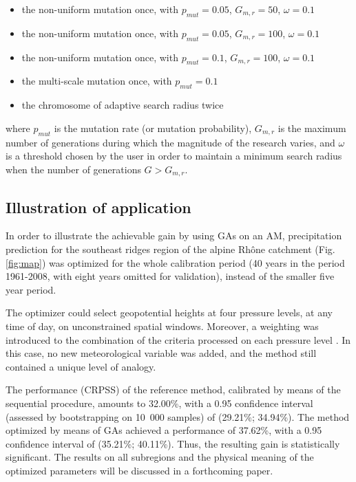 \documentclass{ametsoc}
\begin{document}
\begin{itemize}
	\setlength\itemsep{-4px}
	\item the non-uniform mutation once, with $p_{mut}=0.05$, $G_{m,r}=50$, $\omega=0.1$
	\item the non-uniform mutation once, with $p_{mut}=0.05$, $G_{m,r}=100$, $\omega=0.1$
	\item the non-uniform mutation once, with $p_{mut}=0.1$, $G_{m,r}=100$, $\omega=0.1$
	\item the multi-scale mutation once, with  $p_{mut}=0.1$
	\item the chromosome of adaptive search radius twice
\end{itemize}

where $p_{mut}$ is the mutation rate (or mutation probability), $G_{m,r}$ is the maximum number of generations during which the magnitude of the research varies, and $\omega$ is a threshold chosen by the user in order to maintain a minimum search radius when the number of generations $G>G_{m,r}$.


\subsection{Illustration of application}

In order to illustrate the achievable gain by using GAs on an AM, precipitation prediction for the southeast ridges region of the alpine Rh\^{o}ne catchment (Fig. \ref{fig:map}) was optimized for the whole calibration period (40 years in the period 1961-2008, with eight years omitted for validation), instead of the smaller five year period.

The optimizer could select geopotential heights at four pressure levels, at any time of day, on unconstrained spatial windows. Moreover, a weighting was introduced to the combination of the criteria processed on each pressure level \citep[such as in][]{Horton2012a, Junk2015}. In this case, no new meteorological variable was added, and the method still contained a unique level of analogy.

The performance (CRPSS) of the reference method, calibrated by means of the sequential procedure, amounts to 32.00\%, with a 0.95 confidence interval (assessed by bootstrapping on 10~000 samples) of (29.21\%; 34.94\%). The method optimized by means of GAs achieved a performance of 37.62\%, with a 0.95 confidence interval of (35.21\%; 40.11\%). Thus, the resulting gain is statistically significant. The results on all subregions and the physical meaning of the optimized parameters will be discussed in a forthcoming paper.
\end{document}
